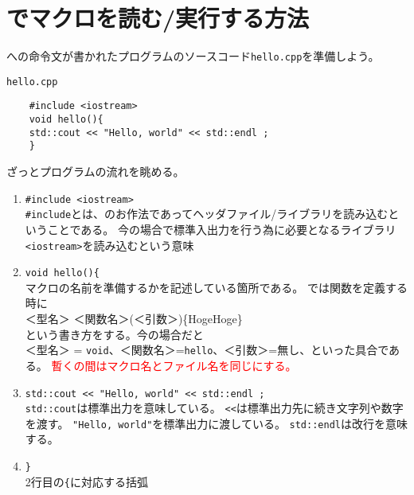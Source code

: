 \clearpage
 \section{\ROOT でマクロを読む/実行する方法}
 \ROOT への命令文が書かれたプログラムのソースコード\verb|hello.cpp|を準備しよう。
 \begin{itembox}{\texttt{hello.cpp}}
\begin{verbatim}
	#include <iostream>
	void hello(){
	std::cout << "Hello, world" << std::endl ;
	}
\end{verbatim}
 \end{itembox}
 ざっとプログラムの流れを眺める。
 \begin{enumerate}
  \item \verb|#include <iostream>| \\
	\verb|#include|とは、\Cpp のお作法であってヘッダファイル/ライブラリを読み込むということである。
	今の場合\Cpp で標準入出力を行う為に必要となるライブラリ\verb|<iostream>|を読み込むという意味
  \item \verb|void hello(){| \\
	マクロの名前を準備するかを記述している箇所である。
	\Cpp では関数を定義する時に \\
	＜型名＞ ＜関数名＞(＜引数＞)\{HogeHoge\} \\
	という書き方をする。今の場合だと\\
	＜型名＞ = \verb|void|、＜関数名＞=\verb|hello|、＜引数＞=無し、といった具合である。
	\textcolor{red}{暫くの間はマクロ名とファイル名を同じにする。}

  \item \verb|std::cout << "Hello, world" << std::endl ;| \\
	\verb|std::cout|は標準出力を意味している。
	\verb|<<|は標準出力先に続き文字列や数字を渡す。
	\verb|"Hello, world"|を標準出力に渡している。
	\verb|std::endl|は改行を意味する。

  \item \verb|}| \\
	2行目の\verb|{|に対応する括弧
 \end{enumerate}

